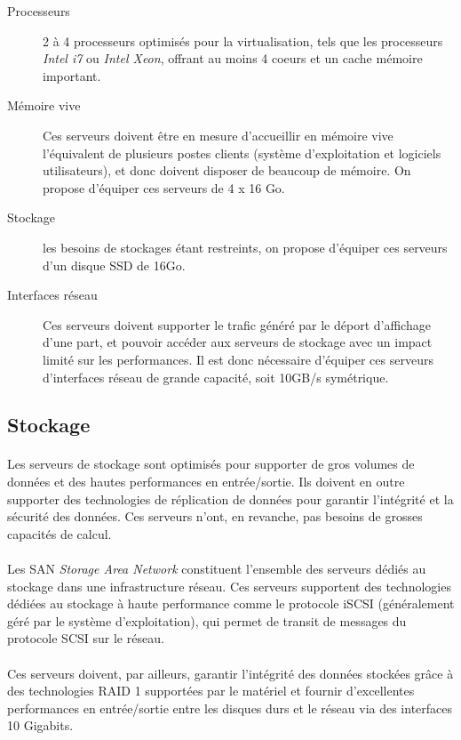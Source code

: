 \begin{description}
  \item[Processeurs] 2 à 4 processeurs optimisés pour la virtualisation, tels
  que les processeurs \emph{Intel i7} ou \emph{Intel Xeon}, offrant au moins 4
  coeurs et un cache mémoire important.
  \item[Mémoire vive] Ces serveurs doivent être en mesure d'accueillir en
  mémoire vive l'équivalent de plusieurs postes clients (système
  d'exploitation et logiciels utilisateurs), et donc doivent disposer de
  beaucoup de mémoire. On propose d'équiper ces serveurs de 4 x 16 Go.
  \item[Stockage] les besoins de stockages étant restreints, on propose
  d'équiper ces serveurs d'un disque SSD de 16Go.
  \item[Interfaces réseau] Ces serveurs doivent supporter le trafic généré par
  le déport d'affichage d'une part, et pouvoir accéder aux serveurs de stockage
  avec un impact limité sur les performances. Il est donc nécessaire d'équiper
  ces serveurs d'interfaces réseau de grande capacité, soit 10GB/s symétrique.
\end{description}

\subsection{Stockage}

\paragraph{} Les serveurs de stockage sont optimisés pour supporter de gros
volumes de données et des hautes performances en entrée/sortie. Ils doivent en
outre supporter des technologies de réplication de données pour garantir
l'intégrité et la sécurité des données. Ces serveurs n'ont, en revanche, pas
besoins de grosses capacités de calcul.

\paragraph{} Les SAN \emph{Storage Area Network} constituent l'ensemble des
serveurs dédiés au stockage dans une infrastructure réseau. Ces serveurs
supportent des technologies dédiées au stockage à haute performance comme
le protocole iSCSI (généralement géré par le système d'exploitation), qui permet de transit de messages du
protocole SCSI sur le réseau.

\paragraph{} Ces serveurs doivent, par ailleurs, garantir l'intégrité des
données stockées grâce à des technologies RAID 1 supportées par le matériel et
fournir d'excellentes performances en entrée/sortie entre les disques durs et le
réseau via des interfaces 10 Gigabits.

